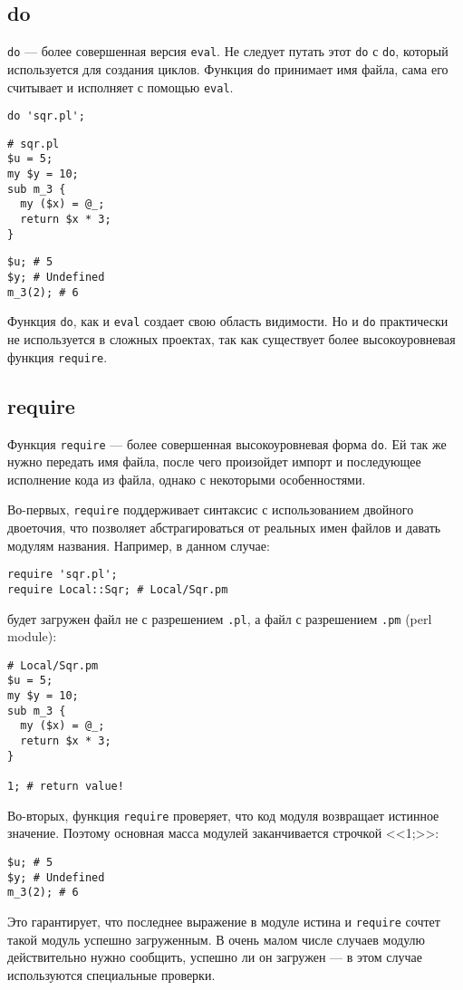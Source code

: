 \subsection{do} %
\verb|do| --- более совершенная версия \verb|eval|. Не следует путать этот \verb|do| с \verb|do|, который используется для создания циклов. Функция \verb|do| принимает имя файла, сама его считывает и исполняет с помощью \verb|eval|.
\begin{verbatim}
do 'sqr.pl';
\end{verbatim}
\begin{verbatim}
# sqr.pl
$u = 5;
my $y = 10;
sub m_3 {
  my ($x) = @_;
  return $x * 3;
}
\end{verbatim}
\begin{verbatim}
$u; # 5
$y; # Undefined
m_3(2); # 6
\end{verbatim}
Функция \verb|do|, как и \verb|eval| создает свою область видимости. Но и \verb|do| практически не используется в сложных проектах, так как существует более высокоуровневая функция \verb|require|.

\subsection{require} %
Функция \verb|require| --- более совершенная высокоуровневая форма \verb|do|. Ей так же нужно передать имя файла, после чего произойдет импорт и последующее исполнение кода из файла, однако с некоторыми особенностями.

Во-первых, \verb|require| поддерживает синтаксис с использованием двойного двоеточия, что позволяет абстрагироваться от реальных имен файлов и давать модулям названия. Например, в данном случае:
\begin{verbatim}
require 'sqr.pl';
require Local::Sqr; # Local/Sqr.pm
\end{verbatim}
будет загружен файл не с разрешением \verb|.pl|, а файл с разрешением \verb|.pm| (perl module):
\begin{verbatim}
# Local/Sqr.pm
$u = 5;
my $y = 10;
sub m_3 {
  my ($x) = @_;
  return $x * 3;
}

1; # return value!
\end{verbatim}
Во-вторых, функция \verb|require| проверяет, что код модуля возвращает истинное значение. Поэтому основная масса модулей заканчивается строчкой <<1;>>:
\begin{verbatim}
$u; # 5
$y; # Undefined
m_3(2); # 6
\end{verbatim}
Это гарантирует, что последнее выражение в модуле истина и \verb|require| сочтет такой модуль успешно загруженным. В очень малом числе случаев модулю действительно нужно сообщить, успешно ли он загружен --- в этом случае используются специальные проверки.

